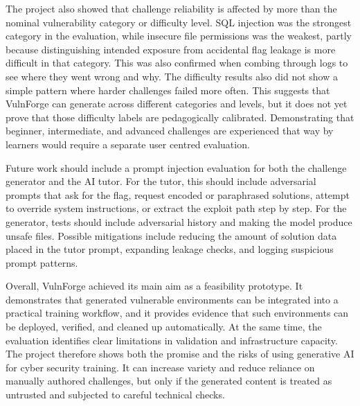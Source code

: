 The project also showed that challenge reliability is affected by more than the nominal vulnerability category or difficulty level. SQL injection was the strongest category in the evaluation, while insecure file permissions was the weakest, partly because distinguishing intended exposure from accidental flag leakage is more difficult in that category. This was also confirmed when combing through logs to see where they went wrong and why. The difficulty results also did not show a simple pattern where harder challenges failed more often. This suggests that VulnForge can generate across different categories and levels, but it does not yet prove that those difficulty labels are pedagogically calibrated. Demonstrating that beginner, intermediate, and advanced challenges are experienced that way by learners would require a separate user centred evaluation.

Future work should include a prompt injection evaluation for both the challenge generator and the AI tutor. For the tutor, this should include adversarial prompts that ask for the flag, request encoded or paraphrased solutions, attempt to override system instructions, or extract the exploit path step by step. For the generator, tests should include adversarial history and making the model produce unsafe files. Possible mitigations include reducing the amount of solution data placed in the tutor prompt, expanding leakage checks, and logging suspicious prompt patterns.

Overall, VulnForge achieved its main aim as a feasibility prototype. It demonstrates that generated vulnerable environments can be integrated into a practical training workflow, and it provides evidence that such environments can be deployed, verified, and cleaned up automatically. At the same time, the evaluation identifies clear limitations in validation and infrastructure capacity. The project therefore shows both the promise and the risks of using generative AI for cyber security training. It can increase variety and reduce reliance on manually authored challenges, but only if the generated content is treated as untrusted and subjected to careful technical checks.
